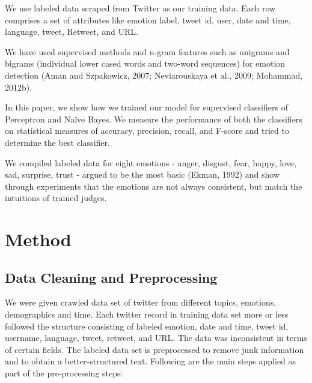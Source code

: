 \documentclass[11pt]{article}
\begin{document}
  We use labeled data scraped from Twitter as our training data. Each row comprises a set of attributes like emotion label, tweet id, user, date and time, language, tweet, Retweet, and URL.
       
  We have used supervised methods and n-gram features such as unigrams and bigrams (individual lower cased words and two-word sequences) for emotion detection (Aman and Szpakowicz, 2007; Neviarouskaya et al., 2009; Mohammad, 2012b).
  
  In this paper, we show how we trained our model for supervised classifiers of Perceptron and Naïve Bayes. We measure the performance of both the classifiers on statistical measures of accuracy, precision, recall, and F-score and tried to determine the best classifier.
   
  We compiled labeled data for eight emotions - anger, disgust, fear, happy, love, sad, surprise, trust - argued to be the most basic (Ekman, 1992) and show through experiments that the emotions are not always consistent, but match the intuitions of trained judges.
  
  \section{Method}
  
  \subsection{Data Cleaning and Preprocessing}
  
  We were given crawled data set of twitter from different topics, emotions, demographics and time. Each twitter record in training data set more or less followed the structure consisting of labeled emotion, date and time, tweet id, username, language, tweet, retweet, and URL. The data was inconsistent in terms of certain fields. The labeled data set is preprocessed to remove junk information and to obtain a better-structured text. Following are the main steps applied as part of the pre-processing steps:
  
\end{document}

